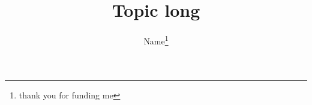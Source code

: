 \documentclass[xcolor=dvipsnames]{beamer}
\title[Topic short]{Topic long}
\author[Name]{Name\footnote{thank you for funding me}}
\begin{document}
\begin{frame}
  \titlepage
\end{frame}
\end{document}
